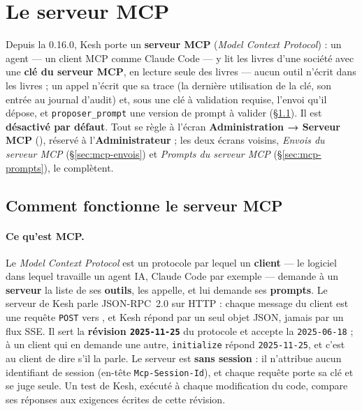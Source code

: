 \documentclass[a4paper,11pt,oneside]{article}
\begin{document}
\section{Le serveur MCP}\label{sec:mcp}

Depuis la 0.16.0, Kesh porte un \textbf{serveur MCP} (\emph{Model Context Protocol}) : un agent --- un client MCP comme Claude Code --- y lit les livres d'une société avec une \textbf{clé du serveur MCP}, en lecture seule des livres --- aucun outil n'écrit dans les livres ; un appel n'écrit que sa trace (la dernière utilisation de la clé, son entrée au journal d'audit) et, sous une clé à validation requise, l'envoi qu'il dépose, et \texttt{proposer\_prompt} une version de prompt à valider (\S\ref{sec:mcp-fonctionnement}). Il est \textbf{désactivé par défaut}. Tout se règle à l'écran \textbf{Administration → Serveur MCP} (), réservé à l'\textbf{Administrateur} ; les deux écrans voisins, \emph{Envois du serveur MCP} (\S\ref{sec:mcp-envois}) et \emph{Prompts du serveur MCP} (\S\ref{sec:mcp-prompts}), le complètent.

\subsection{Comment fonctionne le serveur MCP}\label{sec:mcp-fonctionnement}

\paragraph{Ce qu'est MCP.} Le \emph{Model Context Protocol} est un protocole par lequel un \textbf{client} --- le logiciel dans lequel travaille un agent IA, Claude Code par exemple --- demande à un \textbf{serveur} la liste de ses \textbf{outils}, les appelle, et lui demande ses \textbf{prompts}. Le serveur de Kesh parle JSON-RPC~2.0 sur HTTP : chaque message du client est une requête \texttt{POST} vers , et Kesh répond par un seul objet JSON, jamais par un flux SSE. Il sert la \textbf{révision \texttt{2025-11-25}} du protocole et accepte la \texttt{2025-06-18} ; à un client qui en demande une autre, \texttt{initialize} répond \texttt{2025-11-25}, et c'est au client de dire s'il la parle. Le serveur est \textbf{sans session} : il n'attribue aucun identifiant de session (en-tête \texttt{Mcp-Session-Id}), et chaque requête porte sa clé et se juge seule. Un test de Kesh, exécuté à chaque modification du code, compare ses réponses aux exigences écrites de cette révision.
\end{document}
